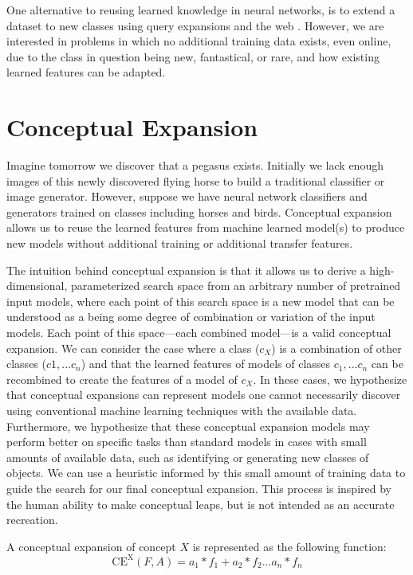 \documentclass[letterpaper]{article}
\begin{document}
One alternative to reusing learned knowledge in neural networks, is to extend a dataset to new classes using query expansions and the web \cite{divvala2014learning,yao2017exploiting} . However, we are interested in problems in which no additional training data exists, even online, due to the class in question being new, fantastical, or rare, and how existing learned features can be adapted.

\section{Conceptual Expansion}

Imagine tomorrow we discover that a pegasus exists. 
Initially we lack enough images of this newly discovered flying horse to build a traditional classifier or image generator. 
However, suppose we have neural network classifiers and generators trained on classes including horses and birds. 
Conceptual expansion allows us to reuse the learned features from machine learned model(s) to produce new models without additional training or additional transfer features.


The intuition behind conceptual expansion is that it allows us to derive a high-dimensional, parameterized search space from an arbitrary number of pretrained input models, where each point of this search space is a new model that can be understood as a being some degree of combination or variation of the input models. 
Each point of this space---each combined model---is a valid conceptual expansion.
We can consider the case where a class ($c_X$) is a combination of other classes ($c1, ...c_n$) and that the learned features of models of classes $c_1, ...c_n$ can be recombined to create the features of a model of $c_X$. In these cases, we hypothesize that conceptual expansions can represent models one cannot necessarily discover using conventional machine learning techniques with the available data. 
Furthermore, we hypothesize that these conceptual expansion models may perform better on specific tasks than standard models in cases with small amounts of available data, such as identifying or generating new classes of objects.
We can use a heuristic informed by this small amount of training data to guide the search for our final conceptual expansion.
This process is inspired by the human ability to make conceptual leaps, but is not intended as an accurate recreation.

A conceptual expansion of concept $X$ is represented as the following function:
\begin{equation} \label{eq1}
  \mathrm{CE^X}(F,A) = a_1*f_1+a_2*f_2... a_n*f_n
\end{equation}
\end{document}
